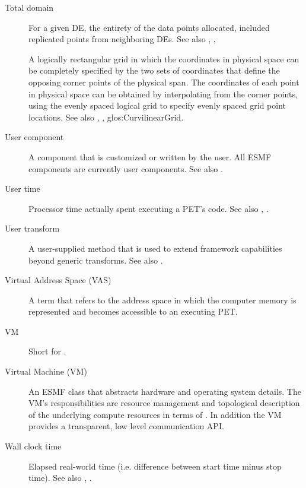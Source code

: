 \begin{description}
\label{glos:TotDomain} 
\item[Total domain] 
  For a given DE, the entirety 
  of the data points allocated, included replicated points from neighboring
  DEs.  See also , 
  , 

\label{glos:UniformGrid}
  A logically rectangular grid in which the coordinates in physical 
  space can be completely specified by the two sets of coordinates
  that define the opposing corner points of the physical span.  The coordinates
  of each point in physical space can be obtained by interpolating from
  the corner points, using the evenly spaced logical grid to specify 
  evenly spaced grid point locations.  See also 
  ,
  , 
  {glos:CurvilinearGrid}.  

\label{glos:UserComp} 
\item[User component] 
  A component that is customized or
  written by the user.  All ESMF components are currently user components.
  See also .

\label{glos:UserTime} 
\item[User time] 
  Processor time actually spent executing 
  a PET's code. See also , 
  .

\label{glos:UserTrans} 
\item[User transform] 
  A user-supplied 
  method that is used to extend framework capabilities beyond generic 
  transforms. See also . 

\label{glos:VAS}
\item[Virtual Address Space (VAS)] A term that refers to 
  the address space in which the computer memory is represented and
  becomes accessible to an executing PET.

\label{glos:VM} 
\item[VM] 
  Short for .

\label{glos:VMachine} 
\item[Virtual Machine (VM)] 
  An ESMF class that abstracts hardware and 
  operating system details. The VM's responsibilities are resource management
  and topological description of the underlying compute resources in terms of 
  . In addition the VM provides a transparent, low level
  communication API. 

\label{glos:WallClockTime} 
\item [Wall clock time] 
  Elapsed real-world time 
  (i.e. difference between start time minus stop time).
  See also , .

\end{description}
